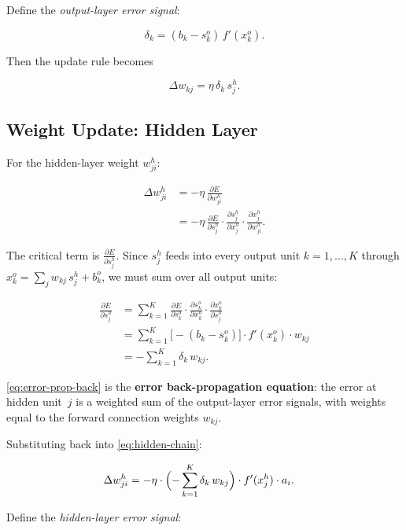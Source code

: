 \documentclass[12pt,a4paper]{article}
\newcommand{\pd}[2]{\frac{\partial #1}{\partial #2}}
\newcommand{\wji}{w_{ji}^{h}}
\newcommand{\wkj}{w_{kj}}
\newcommand{\sho}{s_{j}^{h}}
\newcommand{\sko}{s_{k}^{o}}
\newcommand{\deltak}{\delta_{k}}
\newcommand{\xho}{x_{j}^{h}}
\newcommand{\xko}{x_{k}^{o}}
\begin{document}
Define the \emph{output-layer error signal}:

\begin{equation}
  \deltak = (b_k - \sko)\,f'(\xko).
  \label{eq:delta-k}
\end{equation}

Then the update rule becomes

\begin{equation}
  \boxed{\Delta\wkj = \eta\,\deltak\,\sho.}
  \label{eq:output-rule-final}
\end{equation}

\subsection{Weight Update: Hidden Layer}
\label{sub:hidden-layer-update}

For the hidden-layer weight $\wji$:

\begin{align}
  \Delta\wji
  &= -\eta\,\pd{E}{\wji}\\
  &= -\eta\,\pd{E}{\sho}\cdot\pd{\sho}{\xho}\cdot\pd{\xho}{\wji}.
  \label{eq:hidden-chain}
\end{align}

The critical term is $\pd{E}{\sho}$.  Since $\sho$ feeds into every output
unit $k = 1,\ldots,K$ through $\xko = \sum_j \wkj\,\sho + b_k^{o}$, we
must sum over all output units:

\begin{align}
  \pd{E}{\sho}
  &= \sum_{k=1}^{K}\pd{E}{\sko}\cdot\pd{\sko}{\xko}\cdot\pd{\xko}{\sho}\\
  &= \sum_{k=1}^{K}\bigl[-(b_k - \sko)\bigr]\cdot f'(\xko)\cdot\wkj\\
  &= -\sum_{k=1}^{K}\deltak\,\wkj.
  \label{eq:error-prop-back}
\end{align}

\cref{eq:error-prop-back} is the \textbf{error back-propagation equation}: the
error at hidden unit~$j$ is a weighted sum of the output-layer error signals,
with weights equal to the forward connection weights $\wkj$.

Substituting back into \cref{eq:hidden-chain}:

\begin{align}
  \Delta\wji
  &= -\eta\cdot\Bigl(-\sum_{k=1}^{K}\deltak\,\wkj\Bigr)
     \cdot f'(\xho)\cdot a_i.
\end{align}

Define the \emph{hidden-layer error signal}:
\end{document}
